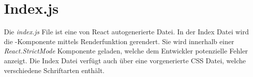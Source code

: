 \section{Index.js}
\label{index}

Die \textit{index.js} File ist eine von React autogenerierte Datei. In der Index Datei wird die 
\underline{}-Komponente mittels Renderfunktion gerendert. Sie wird innerhalb einer 
\textit{React.StrictMode} Komponente geladen, welche dem Entwickler potenzielle Fehler anzeigt.
Die Index Datei verfügt auch über eine vorgenerierte CSS Datei, welche verschiedene Schriftarten 
enthält. 